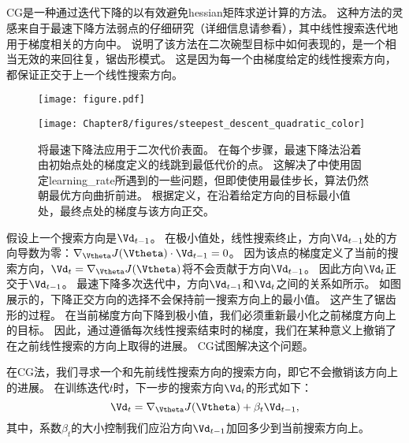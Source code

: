 \subsection{}
\label{sec:conjugate_gradients}
\gls{CG}是一种通过迭代下降的以有效避免\gls{hessian}矩阵求逆计算的方法。
这种方法的灵感来自于最速下降方法弱点的仔细研究（详细信息请参看），其中线性搜索迭代地用于梯度相关的方向中。
说明了该方法在二次碗型目标中如何表现的，是一个相当无效的来回往复，锯齿形模式。
这是因为每一个由梯度给定的线性搜索方向，都保证正交于上一个线性搜索方向。

\begin{figure}[!htb]
\ifOpenSource
\centerline{\texttt{[image: figure.pdf]}}
\else
\centerline{\texttt{[image: Chapter8/figures/steepest\_descent\_quadratic\_color]}}
\fi
\caption{将最速下降法应用于二次代价表面。
在每个步骤，最速下降法沿着由初始点处的梯度定义的线跳到最低代价的点。
这解决了中使用固定\gls{learning_rate}所遇到的一些问题，但即使使用最佳步长，算法仍然朝最优方向曲折前进。
根据定义，在沿着给定方向的目标最小值处，最终点处的梯度与该方向正交。
}
\label{fig:chap8_steepest_descent_quadratic}
\end{figure}



假设上一个搜索方向是$\Vd_{t-1}$。   
在极小值处，线性搜索终止，方向$\Vd_{t-1}$处的方向导数为零：$\nabla_{\Vtheta} J(\Vtheta) \cdot \Vd_{t-1} = 0$。
因为该点的梯度定义了当前的搜索方向，$\Vd_t = \nabla_{\Vtheta} J(\Vtheta)$将不会贡献于方向$\Vd_{t-1}$。
因此方向$\Vd_t$正交于$\Vd_{t-1}$。
最速下降多次迭代中，方向$\Vd_{t-1}$和$\Vd_t$之间的关系如所示。
如图展示的，下降正交方向的选择不会保持前一搜索方向上的最小值。
这产生了锯齿形的过程。
在当前梯度方向下降到极小值，我们必须重新最小化之前梯度方向上的目标。
因此，通过遵循每次线性搜索结束时的梯度，我们在某种意义上撤销了在之前线性搜索的方向上取得的进展。
\gls{CG}试图解决这个问题。

在\gls{CG}法，我们寻求一个和先前线性搜索方向的搜索方向，即它不会撤销该方向上的进展。
在训练迭代$t$时，下一步的搜索方向$\Vd_t$的形式如下：
\begin{equation}
    \Vd_t = \nabla_{\Vtheta} J(\Vtheta) + \beta_t \Vd_{t-1},
\end{equation}
其中，系数$\beta_t$的大小控制我们应沿方向$\Vd_{t-1}$加回多少到当前搜索方向上。

